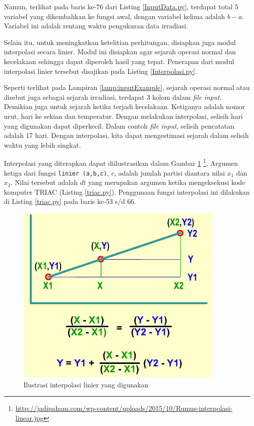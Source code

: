 \documentclass[a4paper,11pt]{report}
\begin{document}
Namun, terlihat pada baris ke-76 dari Listing \ref{InputData.py}, terdapat total 5 variabel yang dikembalikan ke fungsi awal, dengan variabel kelima adalah $b-a$. Variabel ini adalah rentang waktu pengukuran data irradiasi.


Selain itu, untuk meningkatkan ketelitian perhitungan, disiapkan juga modul interpolasi secara linier. Modul ini disiapkan agar sejarah operasi normal dan kecelakaan sehingga dapat diperoleh hasil yang tepat. Penerapan dari modul interpolasi linier tersebut disajikan pada Listing \ref{Interpolasi.py}.

Seperti terlihat pada Lampiran \ref{lamp:inputExample}, sejarah operasi normal atau disebut juga sebagai sejarah irradiasi, terdapat 3 kolom dalam \textit{file input}. Demikian juga untuk sejarah ketika terjadi kecelakaan. Ketiganya adalah nomor urut, hari ke sekian dan temperatur. Dengan melakukan interpolasi, selisih hari yang digunakan dapat diperkecil. Dalam contoh \textit{file input}, selisih pencatatan adalah 17 hari. Dengan interpolasi, kita dapat mengestimasi sejarah dalam selisih waktu yang lebih singkat. 

Interpolasi yang diterapkan dapat diilustrasikan dalam Gambar \ref{fig:interpolasi} \footnote{\url{http://jadipaham.com/wp-content/uploads/2015/10/Rumus-interpolasi-linear.jpg}}. Argumen ketiga dari fungsi \texttt{linier (a,b,c)}, $c$, adalah jumlah partisi diantara nilai $x_1$ dan $x_2$. Nilai tersebut adalah $dt$ yang merupakan argumen ketika mengeksekusi kode komputer TRIAC (Listing \ref{triac.py}). Penggunaan fungsi interpolasi ini dilakukan di Listing \ref{triac.py} pada baris ke-53 s/d 66.

\begin{figure}
  \centering
  \includegraphics[scale=.5]{pics/interpolasi-linear.png}
  \caption{Ilustrasi interpolasi linier yang digunakan}
  \label{fig:interpolasi}
\end{figure}
\end{document}
